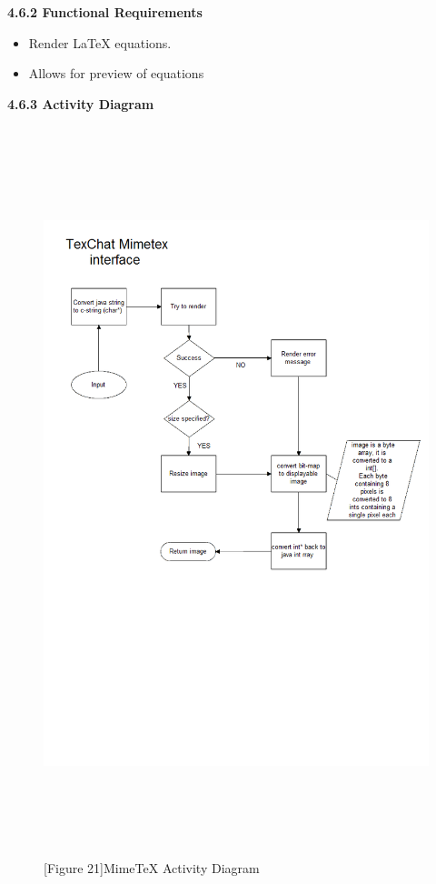 \documentclass[29pt,a4paper]{moderncv}
\begin{document}
		
		\textbf{4.6.2 Functional Requirements}
			\begin{itemize}
				\item Render LaTeX equations.
				\item Allows for preview of equations\\
			\end{itemize}
\newpage
		\left\textbf{4.6.3 Activity Diagram}
		\begin{figure}
			\centering
			\\ \includegraphics[width=6.0in, height=8.0in]{./activityMimeTex.png}
			\\\caption{[Figure 21]MimeTeX Activity Diagram}
		\end{figure}
\newpage
\end{document}
